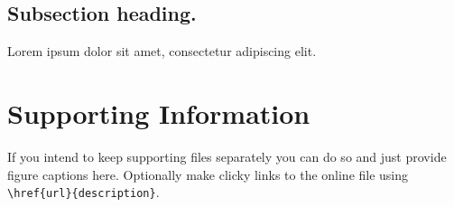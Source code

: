 \documentclass[10pt,letterpaper]{article}
\begin{document}
%
%
%
%


\subsection*{Subsection heading.}

Lorem ipsum dolor sit amet, consectetur adipiscing elit.


\section*{Supporting Information}
If you intend to keep supporting files separately you can do so and just provide figure captions here. Optionally make clicky links to the online file using \verb!\href{url}{description}!.
\end{document}
